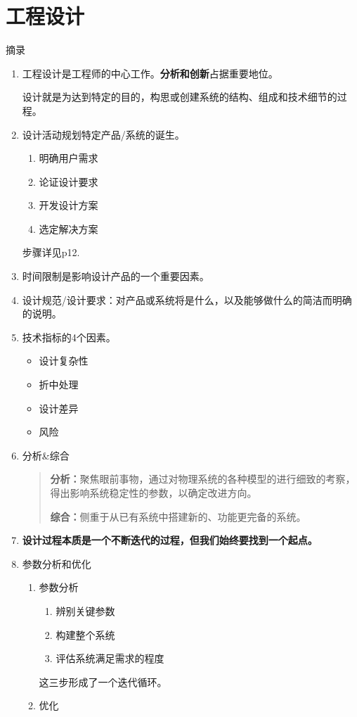 \documentclass[oneside,a4paper]{ctexbook}
\begin{document}
\section{工程设计}
摘录
\begin{enumerate}
    \item 工程设计是工程师的中心工作。\textbf{分析和创新}占据重要地位。
    \begin{tcolorbox}[reset]
        设计就是为达到特定的目的，构思或创建系统的结构、组成和技术细节的过程。
    \end{tcolorbox}
    \item 设计活动规划特定产品/系统的诞生。\begin{enumerate}
        \item 明确用户需求
        \item 论证设计要求
        \item 开发设计方案
        \item 选定解决方案
    \end{enumerate}步骤详见p12.

    \item 时间限制是影响设计产品的一个重要因素。
    \item 设计规范/设计要求：对产品或系统将是什么，以及能够做什么的简洁而明确的说明。
    \item 技术指标的4个因素。\begin{itemize}
        \item 设计复杂性
        \item 折中处理
        \item 设计差异
        \item 风险
    \end{itemize}
    \item 分析\&综合
    \begin{quote}
    \textbf{分析：}聚焦眼前事物，通过对物理系统的各种模型的进行细致的考察，得出影响系统稳定性的参数，以确定改进方向。

    \textbf{综合：}侧重于从已有系统中搭建新的、功能更完备的系统。
    \end{quote}
    \item \textbf{设计过程本质是一个不断迭代的过程，但我们始终要找到一个起点。}
    \item 参数分析和优化
    \begin{enumerate}
        \item 参数分析
        \begin{enumerate}
            \item 辨别关键参数
            \item 构建整个系统
            \item 评估系统满足需求的程度
        \end{enumerate}这三步形成了一个迭代循环。
        \item 优化
    \end{enumerate}
\end{enumerate}
\end{document}
